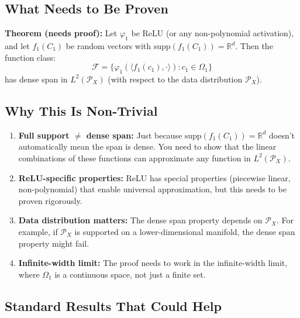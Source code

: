 \subsection{What Needs to Be Proven}

\textbf{Theorem (needs proof):} Let $\varphi_1$ be ReLU (or any non-polynomial activation), and let $f_1(C_1)$ be random vectors with $\text{supp}(f_1(C_1)) = \mathbb{R}^d$. Then the function class:
\[
\mathcal{F} = \{\varphi_1(\langle f_1(c_1), \cdot\rangle) : c_1 \in \Omega_1\}
\]
has dense span in $L^2(\mathcal{P}_X)$ (with respect to the data distribution $\mathcal{P}_X$).

\subsection{Why This Is Non-Trivial}

\begin{enumerate}
\item \textbf{Full support $\neq$ dense span:} Just because $\text{supp}(f_1(C_1)) = \mathbb{R}^d$ doesn't automatically mean the span is dense. You need to show that the linear combinations of these functions can approximate any function in $L^2(\mathcal{P}_X)$.

\item \textbf{ReLU-specific properties:} ReLU has special properties (piecewise linear, non-polynomial) that enable universal approximation, but this needs to be proven rigorously.

\item \textbf{Data distribution matters:} The dense span property depends on $\mathcal{P}_X$. For example, if $\mathcal{P}_X$ is supported on a lower-dimensional manifold, the dense span property might fail.

\item \textbf{Infinite-width limit:} The proof needs to work in the infinite-width limit, where $\Omega_1$ is a continuous space, not just a finite set.
\end{enumerate}

\subsection{Standard Results That Could Help}

